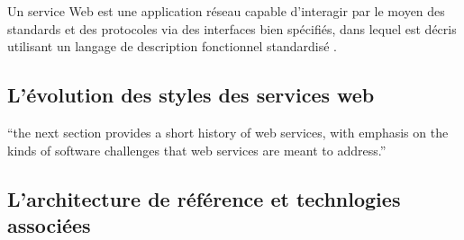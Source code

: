 



	Un service Web est une application réseau capable d'interagir par le moyen des standards et des protocoles 
	via des interfaces bien spécifiés, dans lequel est décris utilisant un langage de description fonctionnel
	standardisé \cite{curbera2001web}.\\


    \subsection{L'évolution des styles des services web}
	``the next section provides a short history of web services, with emphasis on the kinds of software challenges
	that web services are meant to address.''

    \subsection{L'architecture de référence et technlogies associées}
    \cite{curbera2002unraveling} \cite{gottschalk2002introduction} \cite{WSA}

